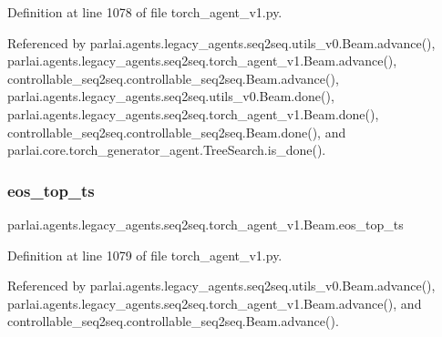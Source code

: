 Definition at line 1078 of file torch\+\_\+agent\+\_\+v1.\+py.



Referenced by parlai.\+agents.\+legacy\+\_\+agents.\+seq2seq.\+utils\+\_\+v0.\+Beam.\+advance(), parlai.\+agents.\+legacy\+\_\+agents.\+seq2seq.\+torch\+\_\+agent\+\_\+v1.\+Beam.\+advance(), controllable\+\_\+seq2seq.\+controllable\+\_\+seq2seq.\+Beam.\+advance(), parlai.\+agents.\+legacy\+\_\+agents.\+seq2seq.\+utils\+\_\+v0.\+Beam.\+done(), parlai.\+agents.\+legacy\+\_\+agents.\+seq2seq.\+torch\+\_\+agent\+\_\+v1.\+Beam.\+done(), controllable\+\_\+seq2seq.\+controllable\+\_\+seq2seq.\+Beam.\+done(), and parlai.\+core.\+torch\+\_\+generator\+\_\+agent.\+Tree\+Search.\+is\+\_\+done().

\mbox{\label{classparlai_1_1agents_1_1legacy__agents_1_1seq2seq_1_1torch__agent__v1_1_1Beam_ab1d9fb1a27a4a96ea9293720eb812487}} 
\subsubsection{\texorpdfstring{eos\+\_\+top\+\_\+ts}{eos\_top\_ts}}
{\footnotesize\ttfamily parlai.\+agents.\+legacy\+\_\+agents.\+seq2seq.\+torch\+\_\+agent\+\_\+v1.\+Beam.\+eos\+\_\+top\+\_\+ts}



Definition at line 1079 of file torch\+\_\+agent\+\_\+v1.\+py.



Referenced by parlai.\+agents.\+legacy\+\_\+agents.\+seq2seq.\+utils\+\_\+v0.\+Beam.\+advance(), parlai.\+agents.\+legacy\+\_\+agents.\+seq2seq.\+torch\+\_\+agent\+\_\+v1.\+Beam.\+advance(), and controllable\+\_\+seq2seq.\+controllable\+\_\+seq2seq.\+Beam.\+advance().

\mbox{\label{classparlai_1_1agents_1_1legacy__agents_1_1seq2seq_1_1torch__agent__v1_1_1Beam_a5e2cb2f6be6aa0d1a6ff971d271356b1}} 
